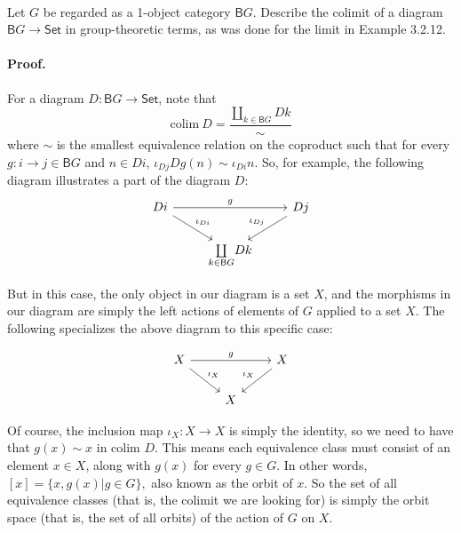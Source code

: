 \documentclass[../../main]{subfiles}
\begin{document}
\paragraph{}
\begin{exercise}
	Let $ G $ be regarded as a 1-object category $ \mathsf{B}G $. Describe the
	colimit of a diagram $ \mathsf{B}G \to \mathsf{Set} $ in group-theoretic
	terms, as was done for the limit in Example 3.2.12.
\end{exercise}
\paragraph{Proof.}

For a diagram $ D: \mathsf{B}G \to \mathsf{Set} $, note that
\[\mathrm{colim}\ D = {\frac{ \underset{k \in \mathsf{B}G}{\coprod} Dk}{\sim}} \]
where $ \sim $ is the smallest equivalence relation on the coproduct such that
for every $ g: i \to j \in \mathsf{B}G $ and $ n \in Di $, $ \iota_{Dj} Dg(n)
\sim \iota_{Di} n $. So, for example, the following diagram illustrates a part
of the diagram $ D $:
\[\begin{tikzcd}
		Di \arrow[rr, "g"] \arrow[rd, "\iota_{Di}"] &  & Dj \arrow[ld, "\iota_{Dj}"'] \\ &
		\underset{k \in \mathsf{B}G}{\coprod} Dk &
\end{tikzcd}\]

But in this case, the only object in our diagram is a set $ X $, and the
morphisms in our diagram are simply the left actions of elements of $ G $
applied to a set $ X. $ The following specializes the above diagram to this
specific case:

\[\begin{tikzcd}
	X \arrow[rr, "g"] \arrow[rd, "\iota_{X}"] &  &
	X \arrow[ld, "\iota_{X}"'] \\ & X &
\end{tikzcd}\]

Of course, the inclusion map $ \iota_X: X \to X $ is simply the identity, so we
need to have that $ g(x) \sim x $ in colim $ D $. This means each equivalence
class must consist of an element $ x \in X $, along with $ g(x) $ for every $ g
\in G $. In other words, $ [x] = \{x, g(x) | g \in G\}, $ also known as the
orbit of $ x $. So the set of all equivalence classes (that is, the colimit we
are looking for) is simply the orbit space (that is, the set of all orbits) of
the action of $ G $ on $ X $.
\end{document}

